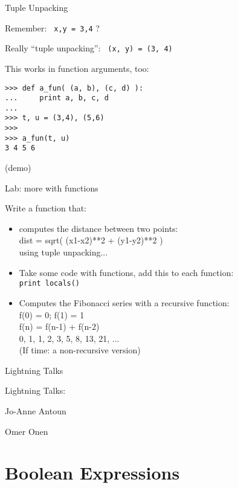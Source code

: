 \documentclass{beamer}
\begin{document}
\begin{frame}[fragile]{Tuple Unpacking}

{\Large Remember: \verb| x,y = 3,4| ?}

\vfill
{\Large Really ``tuple unpacking'': \verb| (x, y) = (3, 4)|}

\vfill
{\Large This works in function arguments, too:}

\begin{verbatim}
>>> def a_fun( (a, b), (c, d) ):
...     print a, b, c, d
... 
>>> t, u = (3,4), (5,6)
>>> 
>>> a_fun(t, u)
3 4 5 6
\end{verbatim}
(demo)
\end{frame}


\begin{frame}[fragile]{Lab: more with functions}

{\Large Write a function that:}
\begin{itemize}
  \item computes the distance between two points:\\
        dist = sqrt( (x1-x2)**2 + (y1-y2)**2 )\\
        using tuple unpacking...
  \item Take some code with functions, add this to each function:\\
        \verb|print locals()|
  \item Computes the Fibonacci series with a recursive function:\\
  f(0) = 0; f(1) = 1\\
  f(n) = f(n-1) + f(n-2)\\
  0, 1, 1, 2, 3, 5, 8, 13, 21, ...\\
  (If time: a non-recursive version)
\end{itemize}

\end{frame}

\begin{frame}[fragile]{Lightning Talks}

\vfill
{\LARGE Lightning Talks:}

\vfill
{\Large Jo-Anne Antoun }

\vfill
{\Large Omer Onen }

\vfill
\end{frame}



\section{Boolean Expressions}
\end{document}
